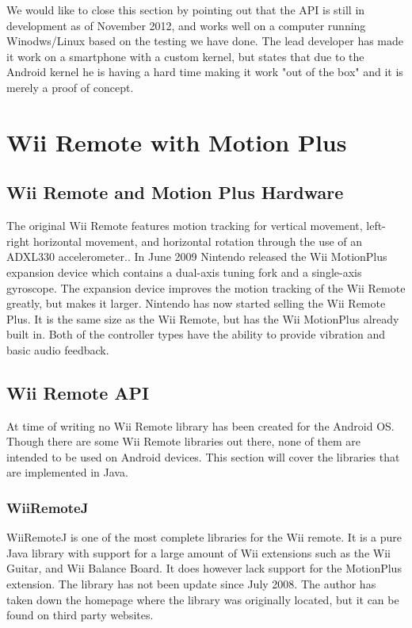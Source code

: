 We would like to close this section by pointing out that the API is still in development as of November 2012, and works well on a computer running Winodws/Linux based on the testing we have done. The lead developer has made it work on a smartphone with a custom kernel, but states that due to the Android kernel he is having a hard time making it work "out of the box" and it is merely a proof of concept.

\section{Wii Remote with Motion Plus}

\subsection{Wii Remote and Motion Plus Hardware}
The original Wii Remote features motion tracking for vertical movement, left-right horizontal movement, and horizontal rotation through the use of an ADXL330 accelerometer.\cite{wiiAccelerometer}. In June 2009 Nintendo released the Wii MotionPlus expansion device which contains a dual-axis tuning fork and a single-axis gyroscope\cite{wiiMotionPlus}. The expansion device improves the motion tracking of the Wii Remote greatly, but makes it larger. Nintendo has now started selling the Wii Remote Plus. It is the same size as the Wii Remote, but has the Wii MotionPlus already built in. Both of the controller types have the ability to provide vibration and basic audio feedback.

\subsection{Wii Remote API}
At time of writing no Wii Remote library has been created for the Android OS. Though there are some Wii Remote libraries out there, none of them are intended to be used on Android devices. This section will cover the libraries that are implemented in Java.

\subsubsection{WiiRemoteJ}
WiiRemoteJ is one of the most complete libraries for the Wii remote. It is a pure Java library with support for a large amount of Wii extensions such as the Wii Guitar, and Wii Balance Board. It does however lack support for the MotionPlus extension. The library has not been update since July 2008. The author has taken down the homepage where the library was originally located, but it can be found on third party websites. \cite{WiiRemoteJ}

